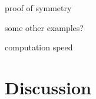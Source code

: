 \documentclass{egpubl}
\begin{document}
proof of symmetry

some other examples?

computation speed


\section{Discussion}


%
%
%
%



%


%



\end{document}

